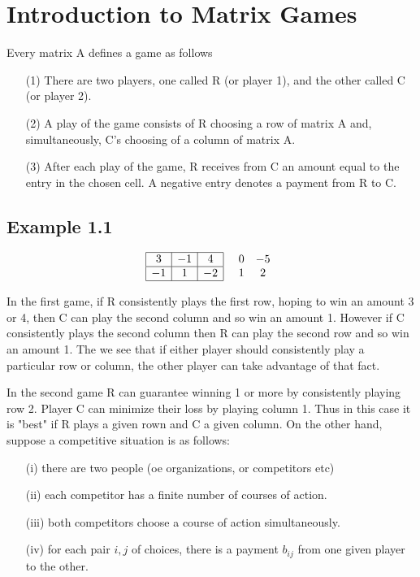 \documentclass[]{report}
\begin{document}
\section{Introduction to Matrix Games}
Every matrix A defines a game as follows
\begin{itemize}
\item[(1)] There are two players, one called R (or player 1), and the other called C (or player 2).
\item[(2)] A play of the game consists of R choosing a row of matrix A and, simultaneously, C's choosing of a column of matrix A.
\item[(3)] After each play of the game, R receives from C an amount equal to the entry in the chosen cell. A negative entry denotes a payment from R to C.

\end{itemize}
\subsection{Example 1.1}
\[ \begin{array}{|c|c|c|} \hline
3 & -1 & 4 \\ \hline 
-1 & 1  & -2 \\ \hline
\end{array} \;\;\;
\begin{array}{cc}
0  & -5 \\
1  & 2  \\
\end{array}\]

In the first game, if R consistently plays the first row, hoping to win an amount 3 or 4, then C can play the second column
and so win an amount 1. However if C consistently plays the second column then R can play the second row and so win an amount 1.
The we see that if either player should consistently play a particular row or column, the other player can take advantage of that fact.

In the second game R can guarantee winning 1 or more by consistently playing row 2. Player C can minimize their loss by playing column 1. Thus in this case it is "best" if R plays a given rown and C a given column.
On the other hand, suppose a competitive situation is as follows:
\begin{itemize}
\item[(i)] there are two people (oe organizations, or competitors etc)
\item[(ii)] each competitor has a finite number of courses of action.
\item[(iii)] both competitors choose a course of action simultaneously.
\item[(iv)] for each pair $i,j$ of choices, there is a payment $b_{ij}$ from one given player to the other.
\end{itemize}
\end{document}
